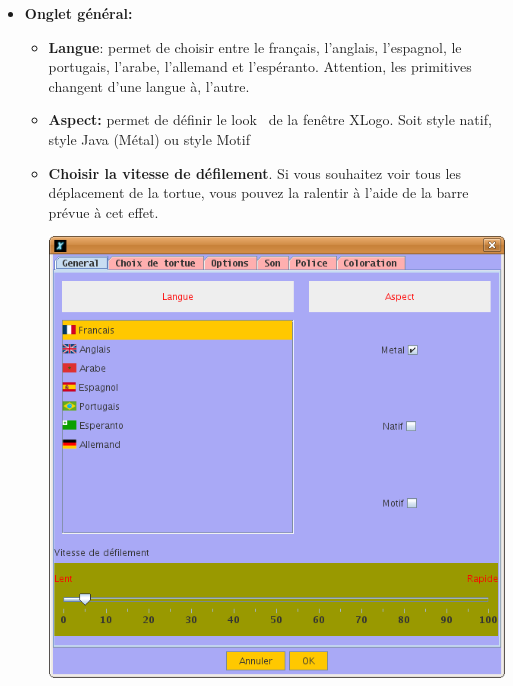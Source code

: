 \begin{itemize}
\begin{itemize} 
 	\item \textbf{Onglet général:} \label{onglet_general}
	\begin{itemize}
 	\item \textbf{Langue}: permet de choisir entre le français, l'anglais, l'espagnol, le portugais, l'arabe, l'allemand et l'espéranto. Attention, les primitives changent d'une langue à, l'autre.\\
	\item \textbf{Aspect:} permet de définir le \og look \fg \ de la fenêtre XLogo. Soit style natif, style Java (Métal) ou style Motif\\
	\item \textbf{Choisir la vitesse de défilement}. Si vous souhaitez voir tous les déplacement de la tortue, vous pouvez la ralentir à l'aide
de la barre prévue à cet effet.
	\begin{center}
 		\includegraphics[scale=0.3]{images/CapturePref1.png}\\
\vspace*{1cm}

\end{center}
\end{itemize}
\end{itemize}
\end{itemize}
